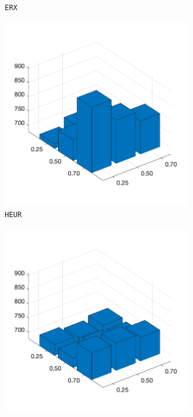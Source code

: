 \begin{figure}[H]
\begin{subfigure}[b]{0.25\textwidth}
		\caption{\texttt{ERX}}
		\label{fig:z}
    	\end{subfigure}
%
	\begin{subfigure}[b]{0.25\textwidth}
		\centering
		\includegraphics[width=0.9\textwidth]{crossover/min/cross_heuristic_1.png}
		\caption{\texttt{HEUR}}
		\label{fig:x}
    	\end{subfigure}
%
	\begin{subfigure}[b]{0.25\textwidth}
		\centering
		\includegraphics[width=0.9\textwidth]{crossover/min/cross_max_preservative_1.png}

\end{subfigure}
\end{figure}
